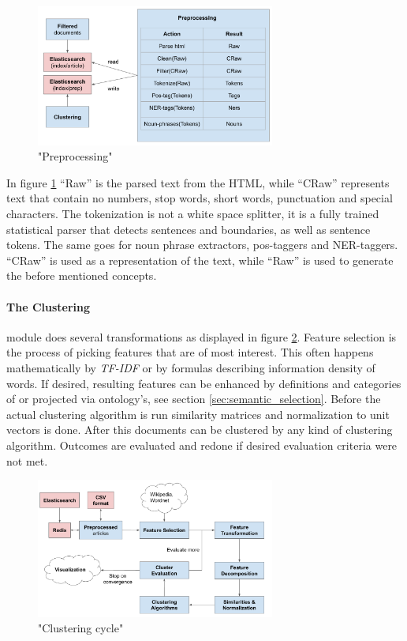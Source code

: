     \begin{figure}[h!]
      \centering
        \includegraphics[width=0.7\textwidth]{preprocessing.png}
        \caption{"Preprocessing"}
        \label{preprocessing}
    \end{figure} 

  In figure \ref{preprocessing} ``Raw'' is the parsed text from the HTML, while ``CRaw'' represents text that contain no numbers, stop words, short words, punctuation and special characters. The tokenization is not a white space splitter, it is a fully trained statistical parser that detects sentences and boundaries, as well as sentence tokens. The same goes for noun phrase extractors, pos-taggers and NER-taggers. ``CRaw'' is used as a representation of the text, while ``Raw'' is used to generate the before mentioned concepts.

  \paragraph{The Clustering} module does several transformations as displayed in figure \ref{clustering_cycle}. Feature selection is the process of picking features that are of most interest. This often happens mathematically by \emph{TF-IDF} or by formulas describing information density of words. If desired, resulting features can be enhanced by definitions and categories of \wiki{} or projected via \wordnet{} ontology's, see section \ref{sec:semantic_selection}. Before the actual clustering algorithm is run similarity matrices and normalization to unit vectors is done. After this documents can be clustered by any kind of clustering algorithm. Outcomes are evaluated and redone if desired evaluation criteria were not met.

  \newpage
    \begin{figure}[h!]
      \centering
        \includegraphics[width=0.7\textwidth]{clustering_cycle.png}
        \caption{"Clustering cycle"}
        \label{clustering_cycle}
    \end{figure} 

